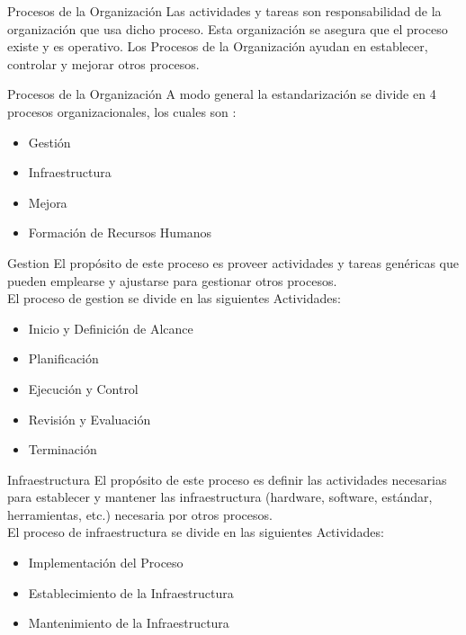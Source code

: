 \documentclass{beamer}
\begin{document}
			\begin{frame}{Procesos de la Organización}
				Las actividades y tareas son responsabilidad de la organización que usa dicho proceso. Esta organización se asegura que el proceso existe y es operativo. Los Procesos de la Organización ayudan en establecer, controlar y mejorar otros procesos.
			\end{frame}
			
			\begin{frame}{Procesos de la Organización}
			A modo general la estandarización se divide en 4 procesos organizacionales, los cuales son :\pause
				\begin{itemize}
					\item Gestión
					\item Infraestructura
					\item Mejora
					\item Formación de Recursos Humanos
				\end{itemize}
			\end{frame}
			
			
			\begin{frame}{Gestion}
			El propósito de este proceso es proveer actividades y tareas genéricas que pueden emplearse y ajustarse para gestionar otros procesos.\\
					
					El proceso de gestion se divide en las siguientes Actividades:	\pause				
					\begin{itemize}
						\item Inicio y Definición de Alcance\pause
						\item Planificación\pause
						\item Ejecución y Control\pause
						\item Revisión y Evaluación\pause
						\item Terminación\pause
					\end{itemize}
			\end{frame}
			
			\begin{frame}{Infraestructura}
				El propósito de este proceso es definir las actividades necesarias para establecer y mantener las infraestructura (hardware, software, estándar, herramientas, etc.) necesaria por otros procesos.\\
				
				El proceso de infraestructura se divide en las siguientes Actividades:\pause
				\begin{itemize}
					\item Implementación del Proceso\pause
					\item Establecimiento de la Infraestructura\pause
					\item Mantenimiento de la Infraestructura
				\end{itemize}
			\end{frame}
			
\end{document}
